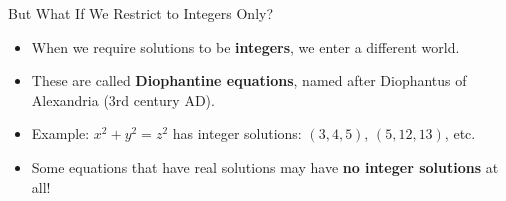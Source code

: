 ﻿\documentclass[10pt,aspectratio=169]{beamer}
\begin{document}
\begin{frame}{But What If We Restrict to Integers Only?}
    \begin{itemize}
        \item When we require solutions to be \textbf{integers}, we enter a different world.
        \item These are called \textbf{Diophantine equations}, named after Diophantus of Alexandria (3rd century AD).
        \item Example: $x^2 + y^2 = z^2$ has integer solutions: $(3,4,5)$, $(5,12,13)$, etc.
        \item Some equations that have real solutions may have \textbf{no integer solutions} at all!
    \end{itemize}
\end{frame}
\end{document}
